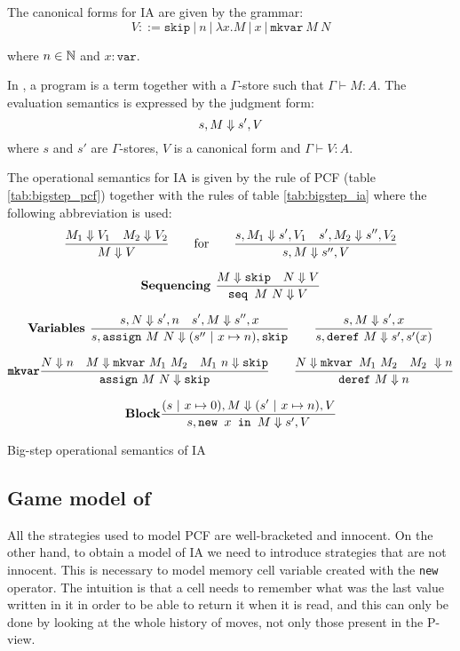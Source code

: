 The canonical forms for IA are given by the grammar:
$$ V ::= \texttt{skip}\ |\ n\ |\ \lambda x. M\ |\ x\ |\  \texttt{mkvar}\ M\ N$$

where $n \in \mathbb{N}$ and $x: \texttt{var}$.


In \ialgol, a program is a term together with a $\Gamma$-store such
that $\Gamma \vdash M : A$. The evaluation semantics is expressed by
the judgment form:
$$s,M \Downarrow s', V$$
where $s$ and $s'$ are $\Gamma$-stores, $V$ is a canonical form and $\Gamma \vdash V : A$.

The operational semantics for IA is given by the rule of PCF (table \ref{tab:bigstep_pcf})
together with the rules of table \ref{tab:bigstep_ia} where the following abbreviation is used:
$$ \frac{\displaystyle M_1 \Downarrow V_1 \quad M_2 \Downarrow V_2}{M \Downarrow V} \qquad \mbox{for} \qquad
  \frac{\displaystyle s,M_1 \Downarrow s',V_1 \quad s', M_2 \Downarrow s'',V_2 }{s,M \Downarrow s'',V}
$$


\begin{table}[htbp]
$$\mbox{\textbf{Sequencing }}
    \frac{\displaystyle M \Downarrow \texttt{skip} \quad N \Downarrow V}{\texttt{seq } M\ N \Downarrow V}
$$

$$\mbox{\textbf{Variables }}
    \frac{\displaystyle s,N \Downarrow s',n \quad s',M \Downarrow s'',x}{s, \texttt{assign}\ M\ N \Downarrow (s''\ |\ x \mapsto n),\texttt{skip}}
\qquad
    \frac{\displaystyle s,M \Downarrow s',x }{s, \texttt{deref}\ M \Downarrow s',s'(x)}$$

$$\mbox{\texttt{\textbf{mkvar}}}
    \frac{\displaystyle N \Downarrow n \quad M \Downarrow \texttt{mkvar}\ M_1\ M_2 \quad M_1\ n \Downarrow \texttt{skip}}{\texttt{assign}\ M\ N \Downarrow \texttt{skip}}
\qquad
    \frac{\displaystyle N \Downarrow \texttt{mkvar } M_1\ M_2 \quad M_2\ \Downarrow n}{\texttt{deref}\ M \Downarrow n}
$$

$$\mbox{\textbf{Block}}
    \frac{\displaystyle (s\ |\ x \mapsto 0),M \Downarrow (s'\ |\ x \mapsto n),V }{s, \texttt{new } x \texttt{ in } M \Downarrow s',V}
$$

\label{tab:bigstep_ia}
\caption{Big-step operational semantics of IA}
\end{table}


\subsection{Game model of \ialgol}

All the strategies used to model PCF are well-bracketed and
innocent. On the other hand, to obtain a model of IA we need to
introduce strategies that are not innocent.
This is necessary to model memory cell variable created with the \texttt{new} operator.
The intuition is that a cell needs to
remember what was the last value written in it in order to be able
to return it when it is read, and this can only be done by looking
at the whole history of moves, not only those present in the P-view.

